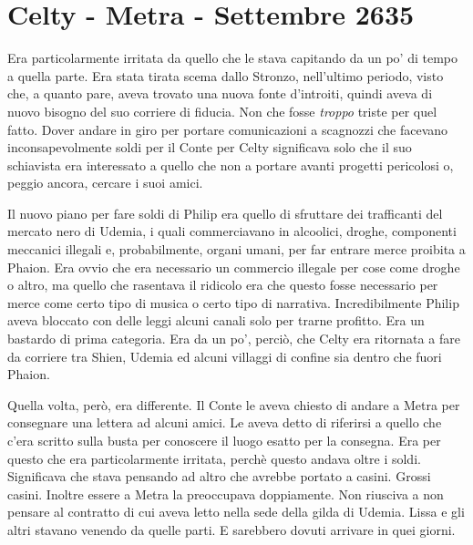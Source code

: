   \section{Celty - Metra - Settembre 2635}

    Era particolarmente irritata da quello che le stava capitando da un po'
    di tempo a quella parte. Era stata tirata scema dallo Stronzo,
    nell'ultimo periodo, visto che, a quanto pare, aveva trovato una nuova
    fonte d'introiti, quindi aveva di nuovo bisogno del suo corriere di
    fiducia. Non che fosse \emph{troppo} triste per quel fatto. Dover
    andare in giro per portare comunicazioni a scagnozzi che facevano
    inconsapevolmente soldi per il Conte per Celty significava solo che il
    suo schiavista era interessato a quello che non a portare avanti
    progetti pericolosi o, peggio ancora, cercare i suoi amici.

    Il nuovo piano per fare soldi di Philip era quello di sfruttare dei
    trafficanti del mercato nero di Udemia, i quali commerciavano in
    alcoolici, droghe, componenti meccanici illegali e, probabilmente,
    organi umani, per far entrare merce proibita a Phaion. Era ovvio che
    era necessario un commercio illegale per cose come droghe o altro, ma
    quello che rasentava il ridicolo era che questo fosse necessario per
    merce come certo tipo di musica o certo tipo di narrativa.
    Incredibilmente Philip aveva bloccato con delle leggi alcuni canali
    solo per trarne profitto. Era un bastardo di prima categoria. Era da un
    po', perciò, che Celty era ritornata a fare da corriere tra Shien,
    Udemia ed alcuni villaggi di confine sia dentro che fuori Phaion.

    Quella volta, però, era differente. Il Conte le aveva chiesto di andare
    a Metra per consegnare una lettera ad alcuni amici. Le aveva detto di
    riferirsi a quello che c'era scritto sulla busta per conoscere il luogo
    esatto per la consegna. Era per questo che era particolarmente
    irritata, perchè questo andava oltre i soldi. Significava che stava
    pensando ad altro che avrebbe portato a casini. Grossi casini. Inoltre
    essere a Metra la preoccupava doppiamente. Non riusciva a non pensare
    al contratto di cui aveva letto nella sede della gilda di Udemia. Lissa
    e gli altri stavano venendo da quelle parti. E sarebbero dovuti
    arrivare in quei giorni.
    
